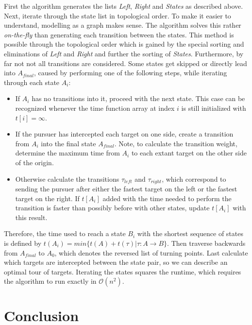 \documentclass[english,version-2019-07]{uzl-thesis}
\begin{document}
First the algorithm generates the lists \emph{Left}, \emph{Right} and \emph{States} as described above. 
Next, iterate through the state list in topological order. To make it easier to understand, modelling as a graph makes sense. The algorithm solves this rather \emph{on-the-fly} than generating each transition between the states. This method is possible through the topological order which is gained by the special sorting and eliminations of \emph{Left} and \emph{Right} and further the sorting of \emph{States}. Furthermore, by far not not all transitions are considered. Some states get skipped or directly lead into $A_{final}$, caused by performing one of the following steps, while iterating through each state $A_i$:

\begin{itemize}
\item
If $A_i$ has no transitions into it, proceed with the next state. This case can be recognized whenever the time function array at index $i$ is still initialized with $t[i] = \infty$. 
\item
If the pursuer has intercepted each target on one side, create a transition from $A_i$ into
the final state $A_{final}$. Note, to calculate the transition weight, determine the maximum time from $A_i$ to each extant target on the other side of the origin.
\item
Otherwise calculate the transitions $\tau_{left}$ and $\tau_{right}$, which correspond to sending the pursuer after either the fastest target on the left or the fastest target on the right. If $t[A_i]$ added with the time needed to perform the transition is faster than possibly before with other states, update $t[A_i]$ with this result.
\end{itemize}

Therefore, the time used to reach a state $B_i$ with the shortest sequence of states is defined by $t(A_i)=min\{t(A)+t(\tau)\vert\tau:A\rightarrow B\}$. Then traverse backwards from $A_{final}$ to $A_0$, which denotes the reversed list of turning points. Last calculate which targets are intercepted between the state pair, so we can describe an optimal tour of targets. Iterating the states squares the runtime, which requires the algorithm to run exactly in $\mathcal{O}(n^2)$.


\chapter{Conclusion}
\end{document}
